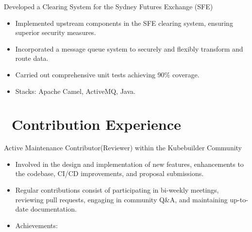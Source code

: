 \documentclass{resume}
\begin{document}
Developed a Clearing System for the Sydney Futures Exchange (SFE)
\begin{itemize}
  \item Implemented upstream components in the SFE clearing system, ensuring superior security measures.
  \item Incorporated a message queue system to securely and flexibly transform and route data.
  \item Carried out comprehensive unit tests achieving 90\% coverage.
  \item Stacks: Apache Camel, ActiveMQ, Java.
\end{itemize}

\section{\faUsers\ Contribution Experience}

Active Maintenance Contributor(Reviewer) within the Kubebuilder Community
\begin{itemize}
  \item Involved in the design and implementation of new features, enhancements to the codebase, CI/CD improvements, and proposal submissions.
  \item Regular contributions consist of participating in bi-weekly meetings, reviewing pull requests, engaging in community Q\&A, and maintaining up-to-date documentation.
  \item Achievements:
     \textperiodcentered\
     \textperiodcentered\
     \textperiodcentered\
\end{itemize}

\end{document}
